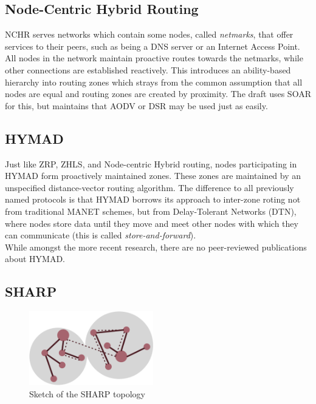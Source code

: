 \documentclass[a4paper,10pt]{scrartcl}
\begin{document}
\subsection{Node-Centric Hybrid Routing}
\label{subsec:nchr}
NCHR\cite{Roy_nodecentric} serves networks which contain some nodes, called \emph{netmarks}, that offer services to their peers, such as being a DNS server or an Internet Access Point. All nodes in the network maintain proactive routes towards the netmarks, while other connections are established reactively. This introduces an ability-based hierarchy into routing zones which strays from the common assumption that all nodes are equal and routing zones are created by proximity. 
The draft uses SOAR\cite{SOAR} for this, but maintains that AODV\cite{RFC-3561} or DSR\cite{DSR} may be used just as easily.

\subsection{\gls{HYMAD}}
\label{subsec:hymad}
Just like ZRP, ZHLS, and Node-centric Hybrid routing, nodes participating in HYMAD \cite{HYMAD} form proactively maintained zones. These zones are maintained by an unspecified distance-vector routing algorithm.
The difference to all previously named protocols is that HYMAD borrows its approach to inter-zone roting not from traditional \gls{MANET} schemes, but from Delay-Tolerant Networks (DTN), where nodes store data until they move and meet other nodes with which they can communicate (this is called \emph{store-and-forward}).\\
While amongst the more recent research, there are no peer-reviewed publications about HYMAD.



\subsection{\gls{SHARP}}
\label{subsec:sharp}
\begin{figure}
  \begin{center}
    \includegraphics[width=0.48\textwidth]{../images/SHARP}
  \end{center}
  \label{fig:area_centered}
  \caption{Sketch of the SHARP topology}
\end{figure}
\end{document}
